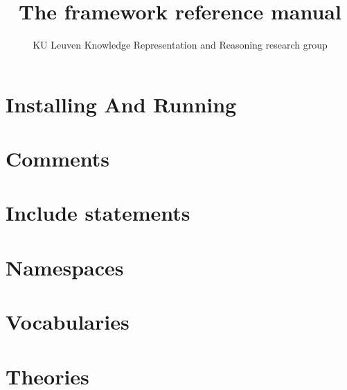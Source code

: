 \documentclass[a4]{article}
\title{The \idp framework reference manual}
\author{KU Leuven Knowledge Representation and Reasoning research group}
\begin{document}
\maketitle
\setlength{\parindent}{0pt}
\newpage
\tableofcontents
\newpage





\section{Installing And Running}


\section{Comments}


\section{Include statements}


\section{Namespaces}


\section{Vocabularies}


\section{Theories}

\end{document}
